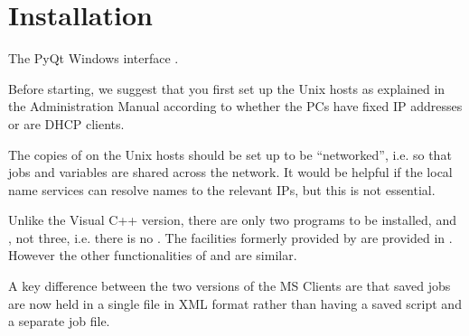 \chapter{Installation}
\label{chp:installation}
The \ProductName{} PyQt Windows interface 
.

Before starting, we suggest that you first set up the Unix hosts as explained in the Administration Manual according to whether the PCs have fixed IP
addresses or are DHCP clients.

The copies of \ProductName{} on the Unix hosts should be set up to be ``networked'', i.e. so that jobs and variables are
shared across the network. It would be helpful if the local name services can resolve names to the relevant IPs, but this is not
essential.


Unlike the Visual C++ version, there are only two programs to be installed,  and , not three, i.e. there is
no . The facilities formerly provided by  are provided in . However the other
functionalities of  and  are similar.

A key difference between the two versions of the MS Clients are that saved jobs are now held in a single file in XML format rather than
having a saved script and a separate job file.



